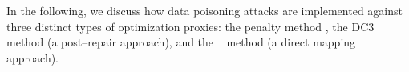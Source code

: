 In the following, we
discuss how data poisoning attacks are implemented against
three distinct types of optimization proxies:  the penalty method \cite{Liu2022Pen}, the DC3 method \cite{Li_2023} (a post--repair approach), and the \LOOPLC~ method \cite{donti2021dc3} (a direct mapping approach).